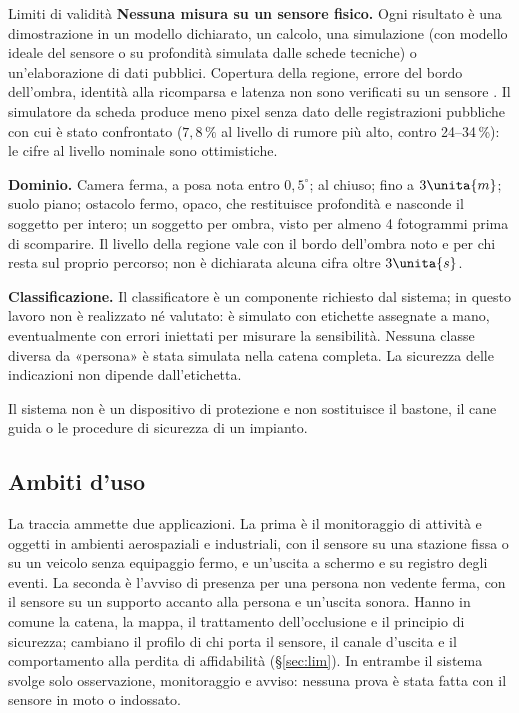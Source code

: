 \begin{riquadro}{Limiti di validità}
\textbf{Nessuna misura su un sensore fisico.} Ogni risultato è una dimostrazione in un modello dichiarato, un calcolo, una simulazione (con modello ideale del sensore o su profondità simulata dalle schede tecniche) o un'elaborazione di dati pubblici. Copertura della regione, errore del bordo dell'ombra, identità alla ricomparsa e latenza non sono verificati su un sensore . Il simulatore da scheda produce meno pixel senza dato delle registrazioni pubbliche con cui è stato confrontato ($7{,}8\,\%$ al livello di rumore più alto, contro 24--34\,\%): le cifre al livello nominale sono ottimistiche.

\textbf{Dominio.} Camera ferma, a posa nota entro $0{,}5^\circ$; al chiuso; fino a $3\unita{m}$; suolo piano; ostacolo fermo, opaco, che restituisce profondità e nasconde il soggetto per intero; un soggetto per ombra, visto per almeno 4 fotogrammi prima di scomparire. Il livello della regione vale con il bordo dell'ombra noto e per chi resta sul proprio percorso; non è dichiarata alcuna cifra oltre $3\unita{s}$.

\textbf{Classificazione.} Il classificatore è un componente richiesto dal sistema; in questo lavoro non è realizzato né valutato: è simulato con etichette assegnate a mano, eventualmente con errori iniettati per misurare la sensibilità. Nessuna classe diversa da «persona» è stata simulata nella catena completa. La sicurezza delle indicazioni non dipende dall'etichetta.

Il sistema non è un dispositivo di protezione e non sostituisce il bastone, il cane guida o le procedure di sicurezza di un impianto.
\end{riquadro}

\subsection{Ambiti d'uso}\label{sec:intro-ambiti}

La traccia ammette due applicazioni. La prima è il monitoraggio di attività e oggetti in ambienti aerospaziali e industriali, con il sensore su una stazione fissa o su un veicolo senza equipaggio fermo, e un'uscita a schermo e su registro degli eventi. La seconda è l'avviso di presenza per una persona non vedente ferma, con il sensore su un supporto accanto alla persona e un'uscita sonora. Hanno in comune la catena, la mappa, il trattamento dell'occlusione e il principio di sicurezza; cambiano il profilo di chi porta il sensore, il canale d'uscita e il comportamento alla perdita di affidabilità (\S\ref{sec:lim}). In entrambe il sistema svolge solo osservazione, monitoraggio e avviso: nessuna prova è stata fatta con il sensore in moto o indossato.

